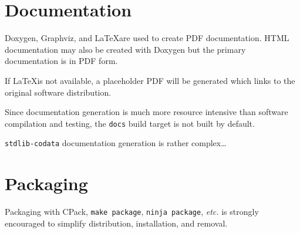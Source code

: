 \section{Documentation}

Doxygen, Graphviz, and \LaTeX are used to create PDF
documentation. HTML documentation may also be created with Doxygen but
the primary documentation is in PDF form.

If \LaTeX is not available, a placeholder PDF will be generated which
links to the original software distribution.

Since documentation generation is much more resource intensive than
software compilation and testing, the \texttt{docs} build target is
not built by default.

\texttt{stdlib-codata} documentation generation is rather complex\ldots

\section{Packaging}

Packaging with CPack, \texttt{make package}, \texttt{ninja package},
\textit{etc.} is strongly encouraged to simplify distribution,
installation, and removal.
